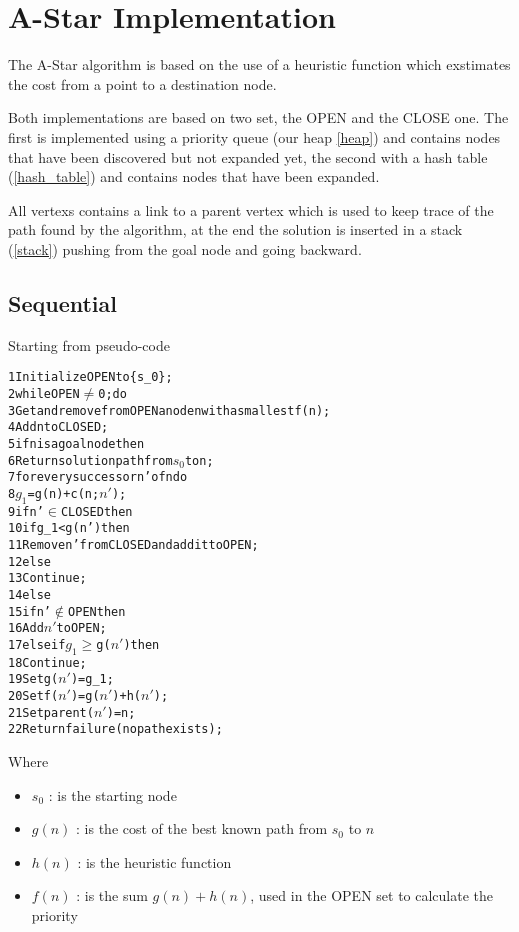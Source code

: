 \section{A-Star Implementation}
\label{Sec:implementation}

The A-Star algorithm is based on the use of a heuristic function which exstimates the cost from a point to a destination node.

Both implementations are based on two set, the OPEN and the CLOSE one. The first is implemented using a priority queue (our heap \ref{heap}) and contains nodes that have been discovered but not expanded yet, the second with a hash table (\ref{hash_table}) and contains nodes that have been expanded.

All vertexs contains a link to a parent vertex which is used to keep trace of the path found by the algorithm, at the end the solution is inserted in a stack (\ref{stack}) pushing from the goal node and going backward.

\subsection{Sequential}

Starting from pseudo-code \cite{bibParAstar}

\begin{alltt}
    1 Initialize OPEN to \{s_0\};
    2 while OPEN \(\neq\) 0; do
    3 Get and remove from OPEN a node n with a smallest f(n);
    4 Add n to CLOSED;
    5 if n is a goal node then
    6   Return solution path from \(s_0\) to n;
    7 for every successor n' of n do
    8   $g_1$ = g(n) + c(n; \(n'\));
    9   if n' \(\in\) CLOSED then
    10      if g_1 < g(n') then
    11          Remove n' from CLOSED and add it to OPEN;
    12      else
    13          Continue;
    14  else
    15      if n' \(\notin\) OPEN then
    16          Add $n'$ to OPEN;
    17      else if $g_1$ \(\geq\) g($n'$) then
    18          Continue;
    19  Set g($n'$) = g_1;
    20  Set f($n'$) = g($n'$) + h($n'$);
    21  Set parent($n'$) = n;
    22 Return failure (no path exists);
\end{alltt}

Where
\begin{itemize}
    \item $s_0$ : is the starting node
    \item $g(n)$ : is the cost of the best known path from $s_0$ to $n$
    \item $h(n)$ : is the heuristic function
    \item $f(n)$ : is the sum $g(n) + h(n)$, used in the OPEN set to calculate the priority
\end{itemize}

